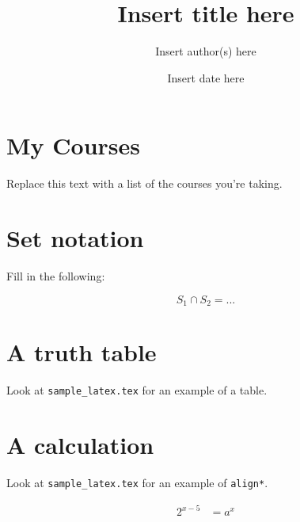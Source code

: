 \documentclass[12pt]{article}
\title{Insert title here}
\author{Insert author(s) here}
\date{Insert date here}
\begin{document}
\maketitle

\section*{My Courses}
Replace this text with a list of the courses you're taking.

\section*{Set notation}

Fill in the following:

\[
S_1 \cap S_2 = ...
\]

\section*{A truth table}

Look at \texttt{sample\_latex.tex} for an example of a table.

\section*{A calculation}

Look at \texttt{sample\_latex.tex} for an example of \texttt{align*}.

\begin{align*}
2^{x - 5} &= a^x \\
\end{align*}
\end{document}
